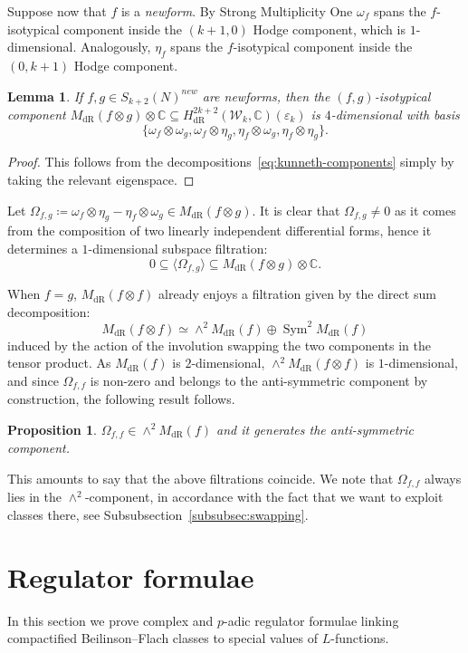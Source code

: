 \documentclass[11pt, a4paper, reqno]{amsart}
\theoremstyle{definition}
\theoremstyle{plain}
\newtheorem{proposition}[definition]{Proposition}
\newtheorem{lemma}[definition]{Lemma}
\theoremstyle{remark}
\DeclareMathOperator{\Sym}{Sym}
\DeclareMathOperator{\dR}{dR}
\newcommand{\numberset}{\mathbb}
\newcommand{\C}{\numberset{C}}
\renewcommand{\epsilon}{\varepsilon}
\newcommand{\KS}{\mathscr{W}}
\begin{document}
 Suppose now that $f$ is a \emph{newform}. By Strong Multiplicity One $\omega_f$ spans the $f$-isotypical component inside the $(k+1,0)$ Hodge component, which is $1$-dimensional. Analogously, $\eta_f$ spans the $f$-isotypical component inside the $(0,k+1)$ Hodge component.
 
 \begin{lemma}
  If $f,g \in S_{k+2}(N)^{new}$ are newforms, then the $(f,g)$-isotypical component $M_{\dR}(f\otimes g) \otimes \C \subseteq H^{2k+2}_{\dR}(\KS_k, \C)(\epsilon_k)$ is $4$-dimensional with basis
  \[
    \{\omega_f\otimes \omega_g, \omega_f \otimes \eta_g, \eta_f\otimes \omega_g, \eta_f\otimes \eta_g\}.
  \]
 \end{lemma}
 
 \begin{proof}
  This follows from the decompositions~\eqref{eq:kunneth-components} simply by taking the relevant eigenspace.
 \end{proof}

Let $\Omega_{f,g} \coloneqq \omega_f \otimes \eta_g - \eta_f\otimes \omega_g \in M_{\dR}(f\otimes g)$. It is clear that $\Omega_{f,g} \neq 0$ as it comes from the composition of two linearly independent differential forms, hence it determines a $1$-dimensional subspace filtration:
\[
    0 \subseteq \langle \Omega_{f,g} \rangle \subseteq M_{\dR}(f\otimes g) \otimes \C.
\]

When $f=g$, $M_{\dR}(f\otimes f)$ already enjoys a filtration given by the direct sum decomposition:
\[
    M_{\dR}(f\otimes f) \simeq \wedge^2 M_{\dR}(f) \oplus \Sym^2 M_{\dR}(f)
\]
induced by the action of the involution swapping the two components in the tensor product. As $M_{\dR}(f)$ is $2$-dimensional, $\wedge^2 M_{\dR}(f\otimes f)$ is $1$-dimensional, and since $\Omega_{f,f}$ is non-zero and belongs to the anti-symmetric component by construction, the following result follows.
\begin{proposition}
    $\Omega_{f,f} \in \wedge^2 M_{\dR}(f)$ and it generates the anti-symmetric component.
\end{proposition}
This amounts to say that the above filtrations coincide. We note that $\Omega_{f,f}$ always lies in the $\wedge^2$-component, in accordance with the fact that we want to exploit classes there, see Subsubsection~\ref{subsubsec:swapping}.



\section{Regulator formulae}
In this section we prove complex and $p$-adic regulator formulae linking compactified Beilinson--Flach classes to special values of $L$-functions.
\end{document}
